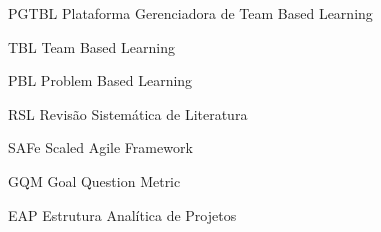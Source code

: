 \begin{siglas}
  \item[PGTBL] Plataforma Gerenciadora de Team Based Learning
  \item[TBL] Team Based Learning
  \item[PBL] Problem Based Learning
  \item[RSL] Revisão Sistemática de Literatura
  \item[SAFe] Scaled Agile Framework
  \item[GQM] Goal Question Metric
  \item[EAP] Estrutura Analítica de Projetos
\end{siglas}
